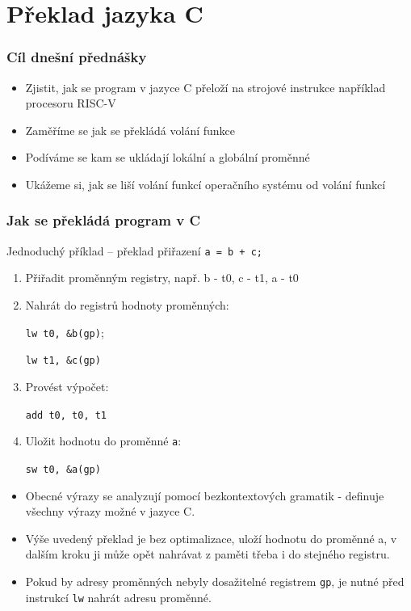 \documentclass{beamer}
\subtitle{Lekce 9. Překlad jazyka C}
\author{Pavel Píša \phantom{xxxxxxxxx} Petr Štěpán \\ \small\texttt{pisa@fel.cvut.cz}\phantom{xxxx}\small\texttt{stepan@fel.cvut.cz}}
\begin{document}
\maketitle

\section{Překlad jazyka C}

\begin{frame}
\frametitle{Cíl dnešní přednášky}

\begin{itemize}
 \item Zjistit, jak se program v jazyce C přeloží na strojové instrukce například procesoru RISC-V
 \item Zaměříme se jak se překládá volání funkce
 \item Podíváme se kam se ukládají lokální a globální proměnné
 \item Ukážeme si, jak se liší volání funkcí operačního systému od volání funkcí
\end{itemize}
\end{frame}


\begin{frame}
\frametitle{Jak se překládá program v C}

Jednoduchý příklad -- překlad přiřazení \texttt{a = b + c;}
\begin{enumerate}
 \item Přiřadit proměnným registry, např. b - t0, c - t1, a - t0
 \item Nahrát do registrů hodnoty proměnných: 
 
 \texttt{lw t0, \&b(gp)}; 
 
 \texttt{lw t1, \&c(gp)}
 \item Provést výpočet: 
 
 \texttt{add t0, t0, t1}
 \item Uložit hodnotu do proměnné \texttt{a}: 
 
 \texttt{sw t0, \&a(gp)} 
\end{enumerate}

\bigskip

\begin{itemize}
 \item Obecné výrazy se analyzují pomocí bezkontextových gramatik - definuje všechny výrazy možné v jazyce C.
 \item Výše uvedený překlad je bez optimalizace, uloží hodnotu do proměnné a, v dalším kroku ji může opět nahrávat z paměti třeba i do stejného registru. 
 \item Pokud by adresy proměnných nebyly dosažitelné registrem \texttt{gp}, je nutné před instrukcí \texttt{lw} nahrát adresu proměnné.
\end{itemize}

\end{frame}
\end{document}
